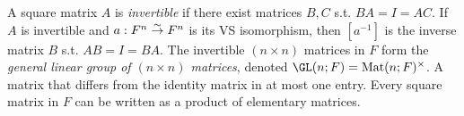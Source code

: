  A square matrix $A$ is \emph{invertible} if there exist matrices $B, C$ s.t. $BA = I = AC$. If $A$ is invertible and $a : F^{n} \stackrel{\sim}{\to} F^{n}$ is its VS isomorphism, then $[a^{-1}]$ is the inverse matrix $B$ s.t. $AB = I = BA$. The invertible $(n \times n)$ matrices in $F$ form the \emph{general linear group of $(n \times n)$ matrices}, denoted $\GL(n; F) = \Mat(n; F)^{\times}$.
 A matrix that differs from the identity matrix in at most one entry.
 Every square matrix in $F$ can be written as a product of elementary matrices.
